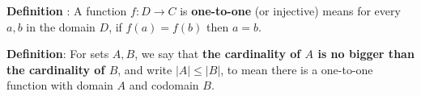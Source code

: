 
{\bf Definition} : A function $f: D  \to C$ is {\bf one-to-one} (or  injective) means for every $a,b$ in the domain $D$, 
if $f(a) = f(b)$ then  $a=b$.

{\bf Definition}:  For sets $A, B$, we say that  {\bf the  cardinality of $A$ is  no  bigger than the cardinality of  $B$}, and 
write $|A| \leq |B|$, to mean there is a  one-to-one function  with domain $A$  and codomain $B$.